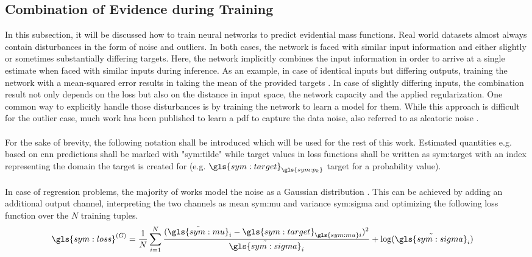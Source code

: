 \subsection{Combination of Evidence during Training}
\label{subsec:uncertainties_ev_theory}
In this subsection, it will be discussed how to train neural networks to predict evidential mass functions. Real world datasets almost always contain disturbances in the form of noise and outliers. In both cases, the network is faced with similar input information and either slightly or sometimes substantially differing targets. Here, the network implicitly combines the input information in order to arrive at a single estimate when faced with similar inputs during inference. As an example, in case of identical inputs but differing outputs, training the network with a mean-squared error results in taking the mean of the provided targets \cite{goodfellow2016deep}. In case of slightly differing inputs, the combination result not only depends on the loss but also on the distance in input space, the network capacity and the applied regularization. One common way to explicitly handle those disturbances is by training the network to learn a model for them. While this approach is difficult for the outlier case, much work has been published to learn a \gls{pdf} to capture the data noise, also referred to as aleatoric noise \cite{kendall2017uncertainties}. 
\\\\
For the sake of brevity, the following notation shall be introduced which will be used for the rest of this work. Estimated quantities e.g. based on \gls{cnn} predictions shall be marked with "\gls{sym:tilde}" while target values in loss functions shall be written as \gls{sym:target} with an index representing the domain the target is created for (e.g. $\gls{sym:target}_{\gls{sym:p_k}}$ target for a probability value).
\\\\
In case of regression problems, the majority of works model the noise as a Gaussian distribution \cite{yang2020d3vo,feng2019leveraging,kendall2017uncertainties}. This can be achieved by adding an additional output channel, interpreting the two channels as mean \gls{sym:mu} and variance \gls{sym:sigma} and optimizing the following loss function over the $N$ training tuples.
\begin{align}
	\gls{sym:loss}^{(G)} &= \dfrac{1}{N}\sum_{i=1}^{N} \dfrac{(\tilde{\gls{sym:mu}}_i - \gls{sym:target}_{\gls{sym:mu}i})^2}{\tilde{\gls{sym:sigma}}_i}+\log(\tilde{\gls{sym:sigma}}_i)
\end{align}
